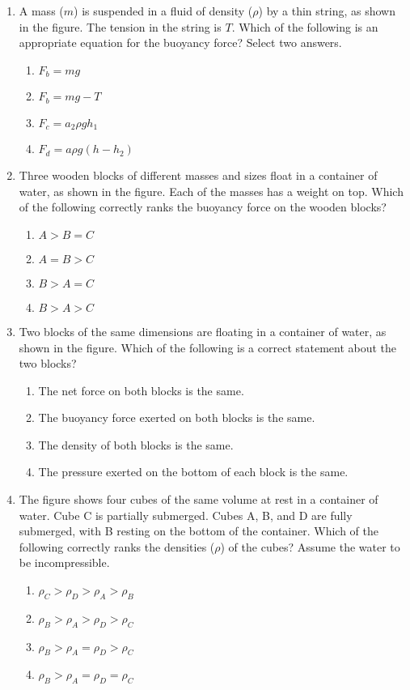 \documentclass{../../oss-apphys}
\begin{document}
\begin{multicols}{2}
\begin{enumerate}[leftmargin=18pt,start=3]
  \item A mass ($m$) is suspended in a fluid of density ($\rho$) by a thin
    string, as shown in the figure. The tension in the string is $T$. Which of
    the following is an appropriate equation for the buoyancy force? Select
    two answers.
    \begin{enumerate}[noitemsep,topsep=0pt,leftmargin=18pt,label=(\Alph*)]
    \item $F_b=mg$
    \item $F_b=mg-T$
    \item $F_c=a_2 \rho gh_1$
    \item $F_d=a\rho g(h-h_2)$
    \end{enumerate}
    
  \item Three wooden blocks of different masses and sizes float in a container
    of water, as shown in the figure. Each of the masses has a weight on top.
    Which of the following correctly ranks the buoyancy force on the wooden
    blocks?
    \begin{enumerate}[noitemsep,topsep=0pt,leftmargin=18pt,label=(\Alph*)]
    \item $A > B = C$
    \item $A = B > C$
    \item $B > A = C$
    \item $B > A > C$
    \end{enumerate}
    
  \item Two blocks of the same dimensions are floating in a container of water,
    as shown in the figure. Which of the following is a correct statement about
    the two blocks?
    \begin{enumerate}[noitemsep,topsep=0pt,leftmargin=18pt,label=(\Alph*)]
    \item The net force on both blocks is the same.
    \item The buoyancy force exerted on both blocks is the same.
    \item The density of both blocks is the same.
    \item The pressure exerted on the bottom of each block is the same.
    \end{enumerate}
    
  \item The figure shows four cubes of the same volume at rest in a container
    of water. Cube C is partially submerged. Cubes A, B, and D are fully
    submerged, with B resting on the bottom of the container. Which of the
    following correctly ranks the densities ($\rho$) of the cubes? Assume the
    water to be incompressible.
    \begin{enumerate}[noitemsep,topsep=0pt,leftmargin=18pt,label=(\Alph*)]
    \item $\rho_C >\rho_D >\rho_A >\rho_B$
    \item $\rho_B >\rho_A >\rho_D >\rho_C$
    \item $\rho_B >\rho_A =\rho_D >\rho_C$
    \item $\rho_B >\rho_A =\rho_D =\rho_C$
    \end{enumerate}


\end{enumerate}
\end{multicols}
\end{document}
